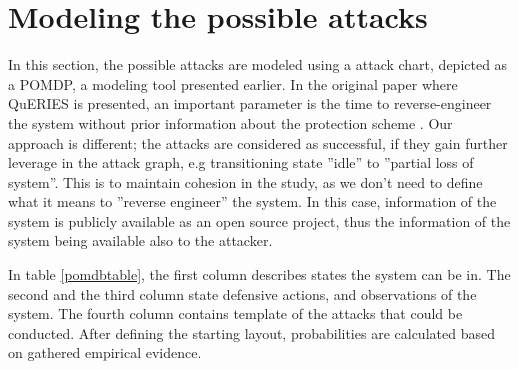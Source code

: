 \section{Modeling the possible attacks}

In this section, the possible attacks are modeled using a attack
chart, depicted as a POMDP, a modeling tool presented earlier. In the
original paper where QuERIES is presented, an important parameter is
the time to reverse-engineer the system without prior information
about the protection scheme \cite{carin2008cybersecurity}. Our
approach is different; the attacks are considered as successful, if
they gain further leverage in the attack graph, e.g transitioning
state ''idle'' to ''partial loss of system''. This is to maintain
cohesion in the study, as we don't need to define what it means to
''reverse engineer'' the system. In this case, information of the
system is publicly available as an open source project, thus the
information of the system being available also to the attacker.

In table \ref{pomdbtable}, the first column describes states the
system can be in. The second and the third column state defensive
actions, and observations of the system. The fourth column contains
template of the attacks that could be conducted. After defining the
starting layout, probabilities are calculated based on gathered
empirical evidence.


